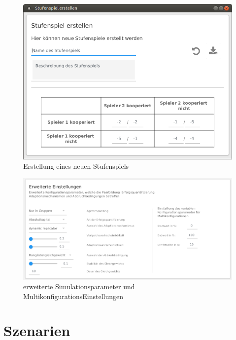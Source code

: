 \documentclass[parskip=full,11pt]{scrartcl}
\begin{document}
\begin{figure}[ht]
	\centering
	\includegraphics[width=\textwidth]{images/game.png}
	\caption{\label{fig:new_game}
		Erstellung eines neuen Stufenspiels}
\end{figure}


\begin{figure}[hb]
	\centering
	\includegraphics[width=\textwidth]{images/konfig_adv.png}
	\caption{\label{fig:konfig_adv}
		erweiterte Simulationsparameter und MultikonfigurationsEinstellungen}
\end{figure}


\section{Szenarien}
\end{document}
